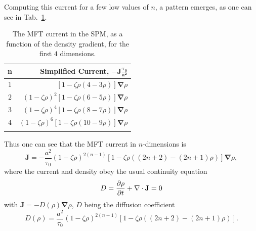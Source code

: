 Computing this current for a few low values of $n$, a pattern emerges, as one can see in Tab.~\ref{tab:currents}.
\begin{table}  \caption[The dependence of MFT current upon dimension in the SPM.]{The MFT current in the SPM, as a function of the density gradient, for the first $4$ dimensions.} \label{tab:currents}
\begin{center}
\begin{tabular}{c | r} 
 n & Simplified Current, $\mathbf{-J \frac{\tau_0}{a^2}}$ \\
 \hline
 $1$  &  $\left[ 1 - \zeta \rho(4 - 3\rho) \right] \mathbf{\nabla} \rho$ \\
 $2$  &  $\left( 1 - \zeta \rho \right)^2 \left[ 1 - \zeta \rho(6 - 5\rho) \right] \mathbf{\nabla} \rho$ \\
 $3$  &  $\left( 1 - \zeta \rho \right)^4 \left[ 1 - \zeta \rho(8 - 7\rho) \right] \mathbf{\nabla} \rho$ \\
 $4$  &  $\left( 1 - \zeta \rho \right)^6 \left[ 1 - \zeta \rho(10 - 9\rho) \right] \mathbf{\nabla} \rho$ \\
 \\
\end{tabular}
\end{center}
\end{table}
Thus one can see that the MFT current in $n$-dimensions is
\begin{equation}
 \mathbf{J} = -\frac{a^2}{\tau_0}\left( 1 - \zeta \rho \right)^{2(n-1)} \left[ 1 - \zeta \rho\left( (2n+2) - (2n+1)\rho \right) \right] \mathbf{\nabla} \rho,
\end{equation}
where the current and density obey the usual continuity equation
\begin{equation}
 D = \frac{\partial \rho}{\partial t} + \mathbf{\nabla} \cdot \mathbf{J} = 0
\end{equation}
with $\mathbf{J} = - D(\rho) \mathbf{\nabla} \rho $, $D$ being the diffusion coefficient
\begin{equation} \label{eq:nDmftDiffCoeff}
 D(\rho) = \frac{a^2}{\tau_0}\left( 1 - \zeta \rho \right)^{2(n-1)} \left[ 1 - \zeta \rho\left( (2n+2) - (2n+1)\rho \right) \right].
\end{equation}


